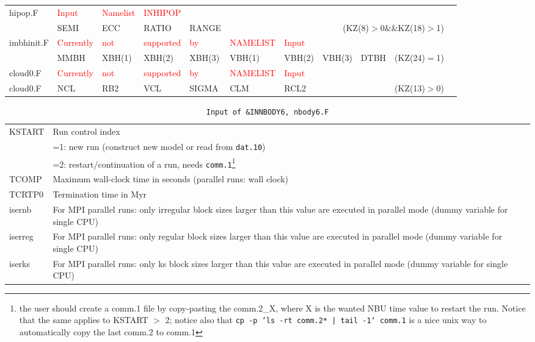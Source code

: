 {\begin{longtable}{|p{0.6in}|*{10}{l}|}
hipop.F & \textcolor{red}{Input}& \textcolor{red}{Namelist}&  \textcolor{red}{INHIPOP} &&&&&&&\\
         & SEMI     & ECC      & RATIO    & RANGE   & 
         &          &\multicolumn{3}{r}{(KZ(8)$>$0$\&\&$KZ(18)$>$1)}&\\ \hline
imbhinit.F & \textcolor{red}{Currently} & \textcolor{red}{not} & \textcolor{red}{supported} & \textcolor{red}{by} & \textcolor{red}{NAMELIST} & \textcolor{red}{Input} &&&&\\
         & MMBH  & XBH(1)   & XBH(2)    & XBH(3)  & VBH(1)
         & VBH(2)   & VBH(3)   & DTBH     &    (KZ(24)$=$1) & \\\hline

cloud0.F & \textcolor{red}{Currently} & \textcolor{red}{not} & \textcolor{red}{supported} & \textcolor{red}{by} & \textcolor{red}{NAMELIST} & \textcolor{red}{Input} &&&& \\
cloud0.F & NCL      & RB2      & VCL      & SIGMA   & CLM 
         & RCL2     &          &          &    (KZ(13)$>$0) & \\\hline
\end{longtable}
}


\vspace{0.2cm}
\noindent
\begin{longtable}{@{}p{1.5cm}p{13.0cm}}
\caption{\texttt{Input of \&INNBODY6, nbody6.F}}
\label{table:innbody6}\\\hline
%
KSTART  & Run control index\\
        & =1: new run (construct new model or read from \texttt{dat.10}) \\
        & =2: restart/continuation of a run, needs \texttt{comm.1}\footnote{the user should create a comm.1 file by copy-pasting the comm.2\_X, where X is the wanted NBU time value to restart the run. Notice that the same applies to KSTART $>$ 2; notice also that \\
        \texttt{cp -p `ls -rt comm.2* | tail -1` comm.1} \\
        is a nice unix way to automatically copy the last comm.2 to comm.1 }\\
%
TCOMP   & Maximum wall-clock time in seconds (parallel runs: wall clock)\\
%
TCRTP0  & Termination time in Myr \\
%
isernb  & For MPI parallel runs: only irregular block sizes larger than
          this value are executed in parallel mode
          (dummy variable for single CPU) \\
iserreg & For MPI parallel runs: only regular block sizes larger than
          this value are executed in parallel mode
          (dummy variable for single CPU) \\
iserks  & For MPI parallel runs: only ks block sizes larger than this value
           are executed in parallel mode 
          (dummy variable for single CPU) \\

\end{longtable}

